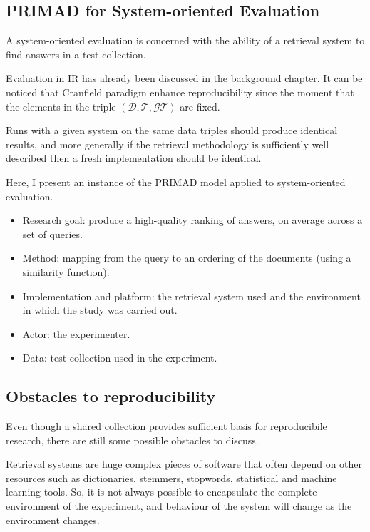 \subsection{PRIMAD for System-oriented Evaluation}

A system-oriented evaluation is concerned with the ability of a retrieval system to find answers in a test collection.

Evaluation in IR has already been discussed in the background chapter. It can be noticed that Cranfield paradigm enhance reproducibility since the moment that the elements in the triple $(\mathcal{D}, \mathcal{T}, \mathcal{GT})$ are fixed.

Runs with a given system on the same data triples should produce identical results, and more generally if the retrieval methodology is sufficiently well described then a fresh implementation should be identical.

Here, I present an instance of the PRIMAD model applied to system-oriented evaluation.

\begin{itemize}
\item Research goal: produce a high-quality ranking of answers, on average across a set of queries.
\item Method: mapping from the query to an ordering of the documents (using a similarity function).
\item Implementation and platform: the retrieval system used and the environment in which the study was carried out.
\item Actor: the experimenter.
\item Data: test collection used in the experiment.
\end{itemize}

\subsection{Obstacles to reproducibility}

Even though a shared collection provides sufficient basis for reproducibile research, there are still some possible obstacles to discuss.

Retrieval systems are huge complex pieces of software that often depend on other resources such as dictionaries, stemmers, stopwords, statistical and machine learning tools. So, it is not always possible to encapsulate the complete environment of the experiment, and behaviour of the system will change as the environment changes.

